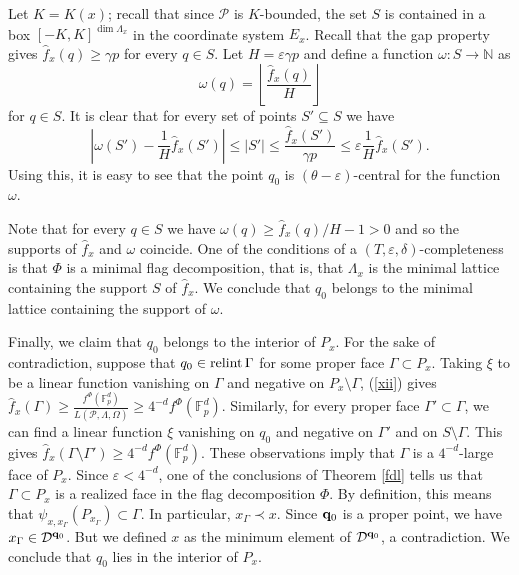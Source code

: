 \documentclass{daj}
\renewcommand{\le}{\leqslant}
\renewcommand{\ge}{\geqslant}
\newcommand{\N}{\mathbb N}
\newcommand{\FF}{\mathbb F}
\newcommand{\D}{\mathcal D}
\renewcommand{\P}{\mathcal P}
\theoremstyle{definition}
\theoremstyle{remark}
\theoremstyle{definition}
\theoremstyle{definition}
\begin{document}
Let $K = K(x)$; recall that since $\P$ is $K$-bounded, the set $S$ is contained in a box $[-K, K]^{\dim \Lambda_x}$ in the coordinate system $E_x$.
Recall that the gap property gives $\hat f_x(q) \ge \gamma p$ for every $q \in S$.  
Let $H =\varepsilon \gamma p$ and define a function $\omega: S \rightarrow \N$ as
$$
\omega(q) = \left\lfloor \frac{\hat f_x(q)}{H}  \right\rfloor
$$
for $q \in S$. It is clear that for every set of points $S' \subseteq S$ we have 
$$
|\omega(S') - \frac{1}{H} \hat f_x(S') | \le |S'| \le \frac{\hat f_x(S')}{\gamma p} \le \varepsilon \frac{1}{H} \hat f_x(S').
$$ 
Using this, it is easy to see that the point $q_0$ is $(\theta-\varepsilon)$-central for the function $\omega$. 

Note that for every $q \in S$ we have $\omega(q) \ge \hat f_x(q)/H-1 > 0$ and so the supports of $\hat f_x$ and $\omega$ coincide. One of the conditions of a $(T, \varepsilon, \delta)$-completeness is that $\Phi$ is a minimal flag decomposition, that is, that $\Lambda_x$ is the minimal lattice containing the support $S$ of $\hat f_x$. We conclude that $q_0$ belongs to the minimal lattice containing the support of $\omega$. 

Finally, we claim that $q_0$ belongs to the interior of $P_x$. For the sake of contradiction, suppose that $q_0 \in {\rm relint}\,\Gamma$ for some proper face $\Gamma \subset P_x$. Taking $\xi$ to be a linear function vanishing on $\Gamma$ and negative on $P_x \setminus \Gamma$, (\ref{xii}) gives $\hat f_x(\Gamma) \ge \frac{f^\Phi(\FF_p^d)}{L(\P, \Lambda, \Omega)} \ge 4^{-d} f^\Phi(\FF_p^d)$. Similarly, for every proper face $\Gamma' \subset \Gamma$, we can find a linear function $\xi$ vanishing on $q_0$ and negative on $\Gamma'$ and on $S \setminus \Gamma$. This gives $\hat f_x(\Gamma \setminus \Gamma') \ge 4^{-d} f^{\Phi}(\FF_p^d)$.
These observations imply that $\Gamma$ is a $4^{-d}$-large face of $P_x$. Since $\varepsilon < 4^{-d}$, one of the conclusions of Theorem \ref{fdl} tells us that $\Gamma \subset P_x$ is a realized face in the flag decomposition $\Phi$. By definition, this means that $\psi_{x, x_\Gamma}(P_{x_\Gamma}) \subset \Gamma$. In particular, $x_\Gamma \prec x$.
Since ${\bf q}_0$ is a proper point, we have $x_\Gamma \in \D^{{\bf q}_0}$. But we defined $x$ as the minimum element of $\D^{{\bf q}_0}$, a contradiction. We conclude that $q_0$ lies in the interior of $P_x$.
\end{document}

